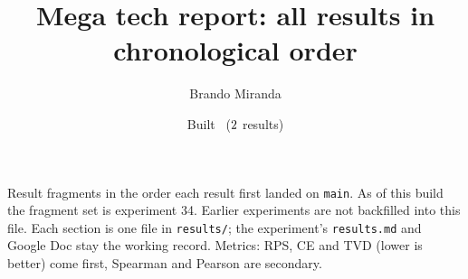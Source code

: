 \documentclass[11pt]{article}
\title{Mega tech report: all results in chronological order}
\author{Brando Miranda}
\date{Built \MegaBuilt\ ($2$ results)}
\begin{document}
\maketitle
\noindent Result fragments in the order each result first landed on \texttt{main}. As of this build the fragment
set is experiment 34. Earlier experiments are not backfilled into this file. Each section is one file in
\texttt{results/}; the experiment's \texttt{results.md} and Google Doc stay the working record. Metrics: RPS, CE and TVD
(lower is better) come first, Spearman and Pearson are secondary.
\bigskip

\end{document}
